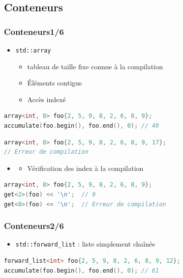 \documentclass[C++.tex]{subfiles}
\begin{document}
\subsection*{Conteneurs}
\begin{frame}[fragile]
	\frametitle{Conteneurs\titlehfill{}1/6}
	\begin{itemize}
		\item \lstinline|std::array|
		\begin{itemize}
			\item tableau de taille fixe connue à la compilation
			\item Éléments contigus
			\item Accès indexé
		\end{itemize}
	\end{itemize}

	\begin{lstlisting}[language=C++]
array<int, 8> foo{2, 5, 9, 8, 2, 6, 8, 9};
accumulate(foo.begin(), foo.end(), 0); // 49\end{lstlisting}

	\begin{lstlisting}[language=C++]
array<int, 8> foo{2, 5, 9, 8, 2, 6, 8, 9, 17};
// Erreur de compilation\end{lstlisting}

\begin{itemize}
	\item[]\begin{itemize}
		\item Vérification des index à la compilation
	\end{itemize}
\end{itemize}

		\begin{lstlisting}[language=C++]
array<int, 8> foo{2, 5, 9, 8, 2, 6, 8, 9};
get<2>(foo) << '\n';  // 9
get<8>(foo) << '\n';  // Erreur de compilation\end{lstlisting}
\end{frame}

\begin{frame}[fragile]
\frametitle{Conteneurs\titlehfill{}2/6}
	\begin{itemize}
		\item \lstinline|std::forward_list| : liste simplement chaînée
	\end{itemize}

	\begin{lstlisting}[language=C++]
forward_list<int> foo{2, 5, 9, 8, 2, 6, 8, 9, 12};
accumulate(foo.begin(), foo.end(), 0); // 61\end{lstlisting}
\end{frame}
\end{document}
